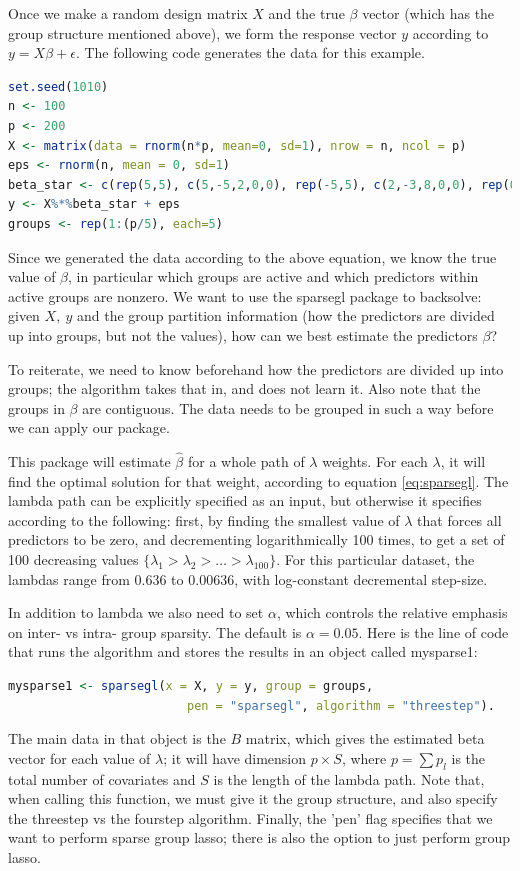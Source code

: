 \documentclass[12pt]{article}
\begin{document}
Once we make a random design matrix $X$ and the true $\beta$ vector (which has the group structure mentioned above), we form the response vector $y$ according to $y=X\beta + \epsilon$. The following code generates the data for this example.

\begin{lstlisting}[language=R]
set.seed(1010)
n <- 100
p <- 200
X <- matrix(data = rnorm(n*p, mean=0, sd=1), nrow = n, ncol = p)
eps <- rnorm(n, mean = 0, sd=1)
beta_star <- c(rep(5,5), c(5,-5,2,0,0), rep(-5,5), c(2,-3,8,0,0), rep(0,(p-20)))
y <- X%*%beta_star + eps
groups <- rep(1:(p/5), each=5)
\end{lstlisting}

Since we generated the data according to the above equation, we know the true value of $\beta$, in particular which groups are active and which predictors within active groups are nonzero. We want to use the sparsegl package to backsolve: given $X,\ y$ and the group partition information (how the predictors are divided up into groups, but not the values), how can we best estimate the predictors $\beta$?

To reiterate, we need to know beforehand how the predictors are divided up into groups; the algorithm takes that in, and does not learn it. Also note that the groups in $\beta$ are contiguous. The data needs to be grouped in such a way before we can apply our package.

This package will estimate $\hat{\beta}$ for a whole path of $\lambda$ weights. For each $\lambda$, it will find the optimal solution for that weight, according to equation \autoref{eq:sparsegl}. The lambda path can be explicitly specified as an input, but otherwise it specifies according to the following: first, by finding the smallest value of $\lambda$ that forces all predictors to be zero, and decrementing logarithmically 100 times, to get a set of 100 decreasing values $\{\lambda_1 > \lambda_2>\dots >\lambda_{100}\}$. For this particular dataset, the lambdas range from $0.636$ to $0.00636$, with log-constant decremental step-size.

In addition to lambda we also need to set $\alpha$, which controls the relative emphasis on inter- vs intra- group sparsity. The default is $\alpha = 0.05$. Here is the line of code that runs the algorithm and stores the results in an object called mysparse1:

\begin{lstlisting}[language=R]
mysparse1 <- sparsegl(x = X, y = y, group = groups,
                         pen = "sparsegl", algorithm = "threestep").
\end{lstlisting}
The main data in that object is the $B$ matrix, which gives the estimated beta vector for each value of $\lambda$; it will have dimension $p\times S$, where $p = \sum p_l$ is the total number of covariates and $S$ is the length of the lambda path. Note that, when calling this function, we must give it the group structure, and also specify the threestep vs the fourstep algorithm. Finally, the 'pen' flag specifies that we want to perform sparse group lasso; there is also the option to just perform group lasso.
\end{document}
